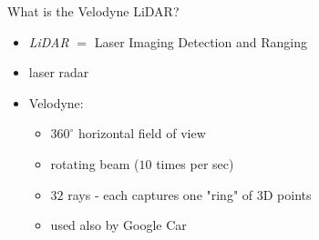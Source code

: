 \documentclass[pdf]{beamer}
\begin{document}
	\begin{frame}{What is the Velodyne LiDAR?}
		\begin{itemize}
			\item \emph{LiDAR} $=$ Laser Imaging Detection and Ranging
			\item laser radar
			\item Velodyne:
			\begin{itemize}
				\item $360^{\circ}$ horizontal field of view
				\item rotating beam ($10$ times per sec) 				
				\item $32$ rays - each captures one "ring" of $3$D points
				\item used also by Google Car 
			\end{itemize}
		\end{itemize}	
		\begin{figure}[h]
			\center
			\quad
			\quad
		\end{figure}
	\end{frame}
\end{document}
